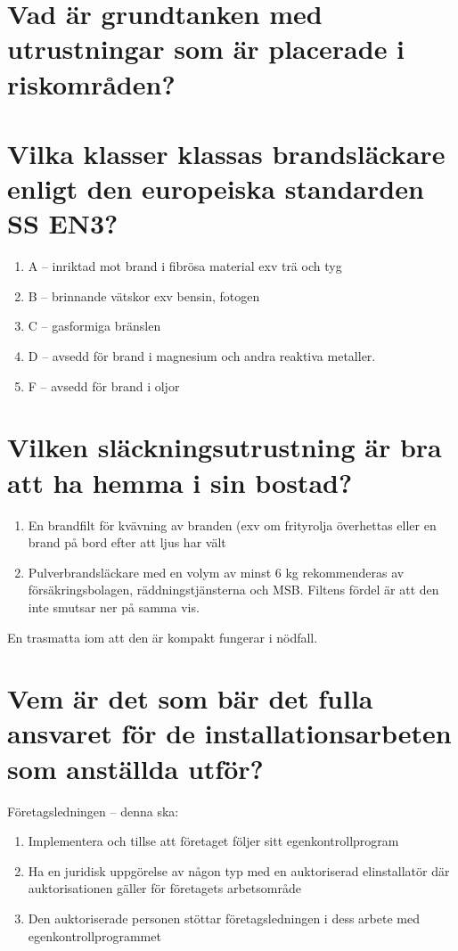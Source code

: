 \documentclass[a4paper,swedish]{article}
\begin{document}
\setcounter{section}{41}
\section{Vad är grundtanken med utrustningar som är placerade i riskområden?}

\setcounter{section}{43}
\section{Vilka klasser klassas brandsläckare enligt den europeiska standarden SS EN3?}

\begin{enumerate}
\item A -- inriktad mot brand i fibrösa material exv trä och tyg
\item B -- brinnande vätskor exv bensin, fotogen
\item C -- gasformiga bränslen
\item D -- avsedd för brand i magnesium och andra reaktiva metaller.
\item F -- avsedd för brand i oljor
\end{enumerate}

\setcounter{section}{45}
\section{Vilken släckningsutrustning är bra att ha hemma i sin bostad?}\label{sec:slackutrustning}

\begin{enumerate}
\item En brandfilt för kvävning av branden (exv om frityrolja överhettas eller en brand på bord
  efter att ljus har vält
\item Pulverbrandsläckare med en volym av minst 6 kg rekommenderas av försäkringsbolagen, räddningstjänsterna och MSB. Filtens fördel är att den inte smutsar ner på samma vis.
\end{enumerate}

En trasmatta iom att den är kompakt fungerar i nödfall.

\setcounter{section}{47}
\section{Vem är det som bär det fulla ansvaret för de installationsarbeten som anställda utför?}\label{sec:ansvar_elarbeten}

Företagsledningen -- denna ska:
\begin{enumerate}
\item Implementera och tillse att företaget följer sitt egenkontrollprogram
\item Ha en juridisk uppgörelse av någon typ med en auktoriserad elinstallatör där auktorisationen
  gäller för företagets arbetsområde
\item Den auktoriserade personen stöttar företagsledningen i dess arbete med egenkontrollprogrammet
\end{enumerate}
\end{document}
